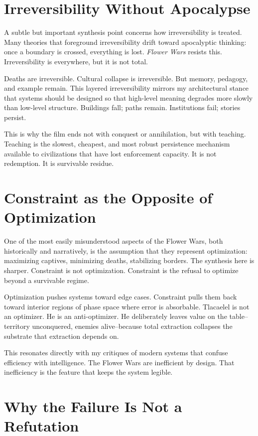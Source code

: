 \documentclass[12pt]{article}
\begin{document}
\section*{Irreversibility Without Apocalypse}

A subtle but important synthesis point concerns how irreversibility is treated. Many theories that foreground irreversibility drift toward apocalyptic thinking: once a boundary is crossed, everything is lost. \textit{Flower Wars} resists this. Irreversibility is everywhere, but it is not total.

Deaths are irreversible. Cultural collapse is irreversible. But memory, pedagogy, and example remain. This layered irreversibility mirrors my architectural stance that systems should be designed so that high-level meaning degrades more slowly than low-level structure. Buildings fall; paths remain. Institutions fail; stories persist.

This is why the film ends not with conquest or annihilation, but with teaching. Teaching is the slowest, cheapest, and most robust persistence mechanism available to civilizations that have lost enforcement capacity. It is not redemption. It is survivable residue.

\section*{Constraint as the Opposite of Optimization}

One of the most easily misunderstood aspects of the Flower Wars, both historically and narratively, is the assumption that they represent optimization: maximizing captives, minimizing deaths, stabilizing borders. The synthesis here is sharper. Constraint is not optimization. Constraint is the refusal to optimize beyond a survivable regime.

Optimization pushes systems toward edge cases. Constraint pulls them back toward interior regions of phase space where error is absorbable. Tlacaelel is not an optimizer. He is an anti-optimizer. He deliberately leaves value on the table--territory unconquered, enemies alive--because total extraction collapses the substrate that extraction depends on.

This resonates directly with my critiques of modern systems that confuse efficiency with intelligence. The Flower Wars are inefficient by design. That inefficiency is the feature that keeps the system legible.

\section*{Why the Failure Is Not a Refutation}
\end{document}
